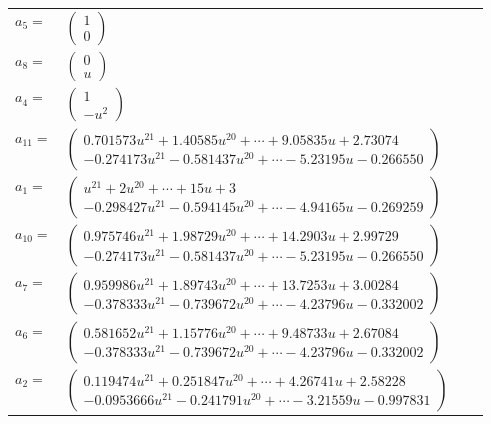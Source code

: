 \documentclass[1p]{elsarticle_modified}
\theoremstyle{definition}
\begin{document}
\begin{tabular}{m{7pt} m{180pt} m{7pt} m{180pt} }
\flushright $a_{5}=$&$\begin{pmatrix}1\\0\end{pmatrix}$ \\
\flushright $a_{8}=$&$\begin{pmatrix}0\\u\end{pmatrix}$ \\
\flushright $a_{4}=$&$\begin{pmatrix}1\\- u^2\end{pmatrix}$ \\
\flushright $a_{11}=$&$\begin{pmatrix}0.701573 u^{21}+1.40585 u^{20}+\cdots+9.05835 u+2.73074\\-0.274173 u^{21}-0.581437 u^{20}+\cdots-5.23195 u-0.266550\end{pmatrix}$ \\
\flushright $a_{1}=$&$\begin{pmatrix}u^{21}+2 u^{20}+\cdots+15 u+3\\-0.298427 u^{21}-0.594145 u^{20}+\cdots-4.94165 u-0.269259\end{pmatrix}$ \\
\flushright $a_{10}=$&$\begin{pmatrix}0.975746 u^{21}+1.98729 u^{20}+\cdots+14.2903 u+2.99729\\-0.274173 u^{21}-0.581437 u^{20}+\cdots-5.23195 u-0.266550\end{pmatrix}$ \\
\flushright $a_{7}=$&$\begin{pmatrix}0.959986 u^{21}+1.89743 u^{20}+\cdots+13.7253 u+3.00284\\-0.378333 u^{21}-0.739672 u^{20}+\cdots-4.23796 u-0.332002\end{pmatrix}$ \\
\flushright $a_{6}=$&$\begin{pmatrix}0.581652 u^{21}+1.15776 u^{20}+\cdots+9.48733 u+2.67084\\-0.378333 u^{21}-0.739672 u^{20}+\cdots-4.23796 u-0.332002\end{pmatrix}$ \\
\flushright $a_{2}=$&$\begin{pmatrix}0.119474 u^{21}+0.251847 u^{20}+\cdots+4.26741 u+2.58228\\-0.0953666 u^{21}-0.241791 u^{20}+\cdots-3.21559 u-0.997831\end{pmatrix}$ \\

\end{tabular}
\end{document}
